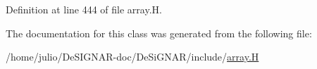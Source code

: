 Definition at line 444 of file array.\+H.



The documentation for this class was generated from the following file\+:\begin{DoxyCompactItemize}
\item 
/home/julio/\+De\+S\+I\+G\+N\+A\+R-\/doc/\+De\+Si\+G\+N\+A\+R/include/\hyperlink{array_8_h}{array.\+H}\end{DoxyCompactItemize}
